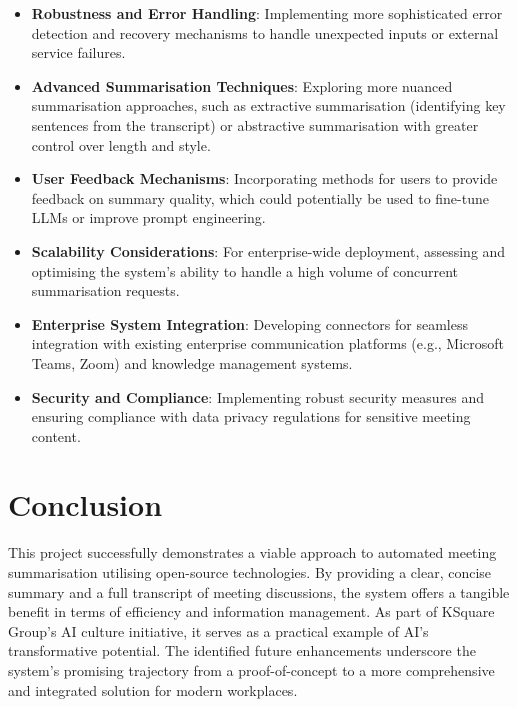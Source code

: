 \documentclass{article}
\begin{document}
\begin{itemize}
    \item \textbf{Robustness and Error Handling}: Implementing more sophisticated error detection and recovery mechanisms to handle unexpected inputs or external service failures.
    \item \textbf{Advanced Summarisation Techniques}: Exploring more nuanced summarisation approaches, such as extractive summarisation (identifying key sentences from the transcript) or abstractive summarisation with greater control over length and style.
    \item \textbf{User Feedback Mechanisms}: Incorporating methods for users to provide feedback on summary quality, which could potentially be used to fine-tune LLMs or improve prompt engineering.
    \item \textbf{Scalability Considerations}: For enterprise-wide deployment, assessing and optimising the system's ability to handle a high volume of concurrent summarisation requests.
    \item \textbf{Enterprise System Integration}: Developing connectors for seamless integration with existing enterprise communication platforms (e.g., Microsoft Teams, Zoom) and knowledge management systems.
    \item \textbf{Security and Compliance}: Implementing robust security measures and ensuring compliance with data privacy regulations for sensitive meeting content.
\end{itemize}

\section{Conclusion}
This project successfully demonstrates a viable approach to automated meeting summarisation utilising open-source technologies. By providing a clear, concise summary and a full transcript of meeting discussions, the system offers a tangible benefit in terms of efficiency and information management. As part of KSquare Group's AI culture initiative, it serves as a practical example of AI's transformative potential. The identified future enhancements underscore the system's promising trajectory from a proof-of-concept to a more comprehensive and integrated solution for modern workplaces.
\end{document}
